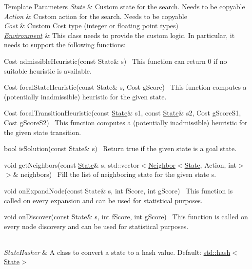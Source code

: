 \begin{DoxyTemplParams}{Template Parameters}
{\em \hyperlink{structlib_multi_robot_planning_1_1_state}{State}} & Custom state for the search. Needs to be copy\textquotesingle{}able \\
\hline
{\em Action} & Custom action for the search. Needs to be copy\textquotesingle{}able \\
\hline
{\em Cost} & Custom Cost type (integer or floating point types) \\
\hline
{\em \hyperlink{classlib_multi_robot_planning_1_1_environment}{Environment}} & This class needs to provide the custom logic. In particular, it needs to support the following functions\+:
\begin{DoxyItemize}
\item {\ttfamily Cost admissible\+Heuristic(const State\& s)}~\newline
 This function can return 0 if no suitable heuristic is available.
\item {\ttfamily Cost focal\+State\+Heuristic(const State\& s, Cost g\+Score)}~\newline
 This function computes a (potentially inadmissible) heuristic for the given state.
\item {\ttfamily Cost focal\+Transition\+Heuristic(const \hyperlink{structlib_multi_robot_planning_1_1_state}{State}\& s1, const \hyperlink{structlib_multi_robot_planning_1_1_state}{State}\& s2, Cost g\+Score\+S1, Cost g\+Score\+S2)}~\newline
 This function computes a (potentially inadmissible) heuristic for the given state transition.
\item {\ttfamily bool is\+Solution(const State\& s)}~\newline
 Return true if the given state is a goal state.
\item {\ttfamily void get\+Neighbors(const \hyperlink{structlib_multi_robot_planning_1_1_state}{State}\& s, std\+::vector$<$\hyperlink{structlib_multi_robot_planning_1_1_neighbor}{Neighbor}$<$\hyperlink{structlib_multi_robot_planning_1_1_state}{State}, Action, int$>$ $>$\& neighbors)}~\newline
 Fill the list of neighboring state for the given state s.
\item {\ttfamily void on\+Expand\+Node(const State\& s, int f\+Score, int g\+Score)}~\newline
 This function is called on every expansion and can be used for statistical purposes.
\item {\ttfamily void on\+Discover(const State\& s, int f\+Score, int g\+Score)}~\newline
 This function is called on every node discovery and can be used for statistical purposes.
\end{DoxyItemize}\\
\hline
{\em State\+Hasher} & A class to convert a state to a hash value. Default\+: \hyperlink{structstd_1_1hash_3_01_state_01_4}{std\+::hash$<$\+State$>$} \\
\hline
\end{DoxyTemplParams}


